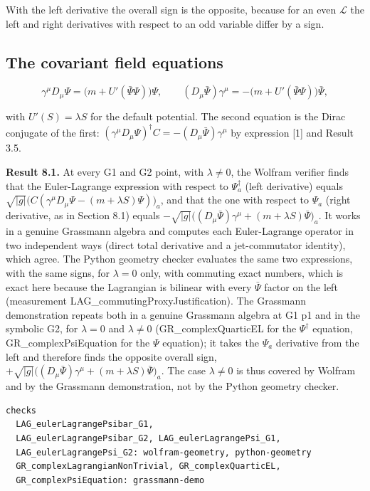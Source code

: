\documentclass[11pt]{article}
\begin{document}
With the left derivative the overall sign is the opposite, because for an even $\mathcal L$ the left and right derivatives with respect to an odd variable differ by a sign.

\subsection{The covariant field equations}

\[
\gamma^\mu D_\mu\Psi=\bigl(m+U'(\bar\Psi\Psi)\bigr)\Psi,\qquad (D_\mu\bar\Psi)\gamma^\mu=-\bigl(m+U'(\bar\Psi\Psi)\bigr)\bar\Psi,
\]

with $U'(S)=\lambda S$ for the default potential. The second equation is the Dirac conjugate of the first: $(\gamma^\mu D_\mu\Psi)^\dagger C=-(D_\mu\bar\Psi)\gamma^\mu$ by expression [1] and Result 3.5.

\textbf{Result 8.1.} At every G1 and G2 point, with $\lambda\ne0$, the Wolfram verifier finds that the Euler-Lagrange expression with respect to $\Psi^\dagger_a$ (left derivative) equals $\sqrt{|g|}\bigl(C(\gamma^\mu D_\mu\Psi-(m+\lambda S)\Psi)\bigr)_a$, and that the one with respect to $\Psi_a$ (right derivative, as in Section 8.1) equals $-\sqrt{|g|}\bigl((D_\mu\bar\Psi)\gamma^\mu+(m+\lambda S)\bar\Psi\bigr)_a$. It works in a genuine Grassmann algebra and computes each Euler-Lagrange operator in two independent ways (direct total derivative and a jet-commutator identity), which agree. The Python geometry checker evaluates the same two expressions, with the same signs, for $\lambda=0$ only, with commuting exact numbers, which is exact here because the Lagrangian is bilinear with every $\bar\Psi$ factor on the left (measurement LAG\_commutingProxyJustification). The Grassmann demonstration repeats both in a genuine Grassmann algebra at G1 p1 and in the symbolic G2, for $\lambda=0$ and $\lambda\ne0$ (GR\_complexQuarticEL for the $\Psi^\dagger$ equation, GR\_complexPsiEquation for the $\Psi$ equation); it takes the $\Psi_a$ derivative from the left and therefore finds the opposite overall sign, $+\sqrt{|g|}\bigl((D_\mu\bar\Psi)\gamma^\mu+(m+\lambda S)\bar\Psi\bigr)_a$. The case $\lambda\ne0$ is thus covered by Wolfram and by the Grassmann demonstration, not by the Python geometry checker.

\begin{Verbatim}[fontsize=\small]
checks
  LAG_eulerLagrangePsibar_G1,
  LAG_eulerLagrangePsibar_G2, LAG_eulerLagrangePsi_G1,
  LAG_eulerLagrangePsi_G2: wolfram-geometry, python-geometry
  GR_complexLagrangianNonTrivial, GR_complexQuarticEL,
  GR_complexPsiEquation: grassmann-demo
\end{Verbatim}
\end{document}
